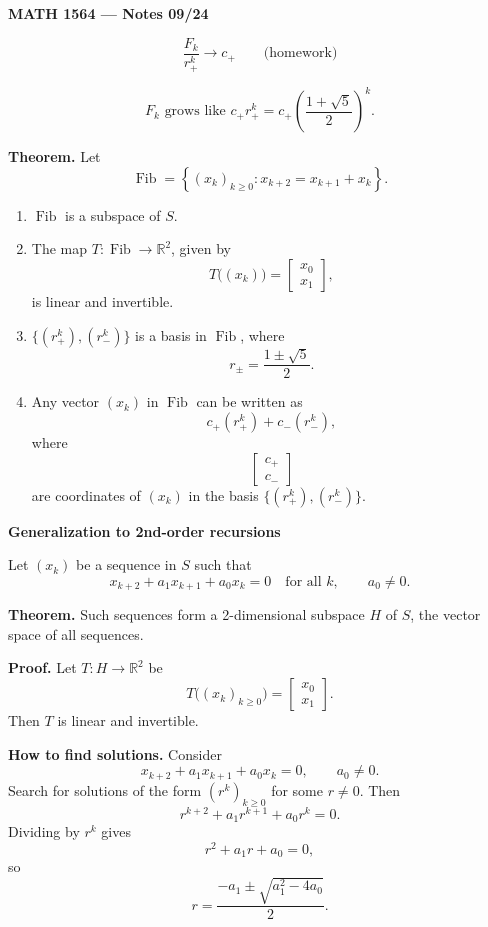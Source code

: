 \documentclass[letterpaper]{article}
\begin{document}
\textbf{MATH 1564 --- Notes 09/24}

\bigskip

\[
\frac{F_k}{r_+^k}\longrightarrow c_+ \qquad \text{(homework)}
\]

\[
F_k\text{ grows like }c_+r_+^k
=c_+\left(\frac{1+\sqrt5}{2}\right)^k.
\]

\bigskip

\textbf{Theorem.} Let
\[
\operatorname{Fib}=\left\{(x_k)_{k\geq0}:x_{k+2}=x_{k+1}+x_k\right\}.
\]
\begin{enumerate}
\item $\operatorname{Fib}$ is a subspace of $S$.
\item The map $T:\operatorname{Fib}\to\mathbb{R}^2$, given by
\[
T\bigl((x_k)\bigr)=\begin{bmatrix}x_0\\x_1\end{bmatrix},
\]
is linear and invertible.
\item $\{(r_+^k),(r_-^k)\}$ is a basis in $\operatorname{Fib}$, where
\[
r_\pm=\frac{1\pm\sqrt5}{2}.
\]
\item Any vector $(x_k)$ in $\operatorname{Fib}$ can be written as
\[
c_+(r_+^k)+c_-(r_-^k),
\]
where
\[
\begin{bmatrix}c_+\\c_-\end{bmatrix}
\]
are coordinates of $(x_k)$ in the basis $\{(r_+^k),(r_-^k)\}$.
\end{enumerate}

\bigskip

\textbf{Generalization to 2nd-order recursions}

\medskip

Let $(x_k)$ be a sequence in $S$ such that
\[
x_{k+2}+a_1x_{k+1}+a_0x_k=0\quad \text{for all }k,\qquad a_0\ne0.
\]

\textbf{Theorem.} Such sequences form a 2-dimensional subspace $H$ of $S$, the vector space of all sequences.

\textbf{Proof.} Let $T:H\to\mathbb{R}^2$ be
\[
T\bigl((x_k)_{k\geq0}\bigr)=\begin{bmatrix}x_0\\x_1\end{bmatrix}.
\]
Then $T$ is linear and invertible.

\bigskip

\textbf{How to find solutions.} Consider
\[
x_{k+2}+a_1x_{k+1}+a_0x_k=0,\qquad a_0\ne0.
\]
Search for solutions of the form $(r^k)_{k\geq0}$ for some $r\ne0$. Then
\[
r^{k+2}+a_1r^{k+1}+a_0r^k=0.
\]
Dividing by $r^k$ gives
\[
r^2+a_1r+a_0=0,
\]
so
\[
r=\frac{-a_1\pm\sqrt{a_1^2-4a_0}}{2}.
\]
\end{document}
